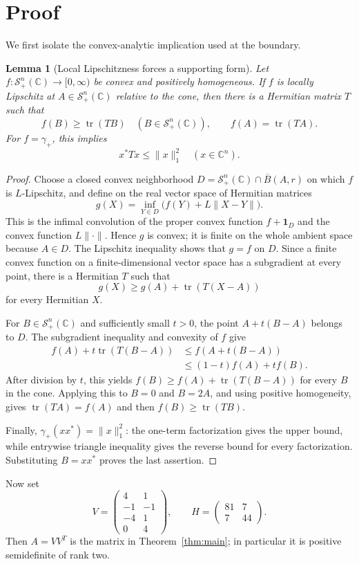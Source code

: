 \documentclass[11pt]{article}
\newtheorem{lemma}{Lemma}
\newcommand{\gp}{\gamma_+}
\newcommand{\psd}{\mathcal S_+}
\newcommand{\C}{\mathbb C}
\newcommand{\tr}{\operatorname{tr}}
\begin{document}
\section{Proof}

We first isolate the convex-analytic implication used at the boundary.

\begin{lemma}[Local Lipschitzness forces a supporting form]\label{lem:support}
Let $f:\psd^n(\C)\to[0,\infty)$ be convex and positively homogeneous. If
$f$ is locally Lipschitz at $A\in\psd^n(\C)$ relative to the cone, then there
is a Hermitian matrix $T$ such that
\[
 f(B)\geq \tr(TB)\quad(B\in\psd^n(\C)),
 \qquad f(A)=\tr(TA).
\]
For $f=\gp$, this implies
\[
 x^*Tx\leq\|x\|_1^2\quad(x\in\C^n).
\]
\end{lemma}

\begin{proof}
Choose a closed convex neighborhood
$D=\psd^n(\C)\cap\overline B(A,r)$ on which $f$ is $L$-Lipschitz, and define
on the real vector space of Hermitian matrices
\[
 g(X)=\inf_{Y\in D}\bigl(f(Y)+L\|X-Y\|\bigr).
\]
This is the infimal convolution of the proper convex function
$f+\mathbf 1_D$ and the convex function $L\|\cdot\|$. Hence $g$ is convex;
it is finite on the whole ambient space because $A\in D$. The Lipschitz
inequality shows that $g=f$ on $D$. Since a finite convex function on a
finite-dimensional vector space has a subgradient at every point, there is a
Hermitian $T$ such that
\[
 g(X)\geq g(A)+\tr(T(X-A))
\]
for every Hermitian $X$.

For $B\in\psd^n(\C)$ and sufficiently small $t>0$, the point
$A+t(B-A)$ belongs to $D$. The subgradient inequality and convexity of $f$
give
\begin{align*}
 f(A)+t\tr(T(B-A))
 &\leq f(A+t(B-A))\\
 &\leq (1-t)f(A)+tf(B).
\end{align*}
After division by $t$, this yields
$f(B)\geq f(A)+\tr(T(B-A))$ for every $B$ in the cone. Applying this to
$B=0$ and $B=2A$, and using positive homogeneity, gives
$\tr(TA)=f(A)$ and then $f(B)\geq\tr(TB)$.

Finally, $\gp(xx^*)=\|x\|_1^2$: the one-term factorization gives the upper
bound, while entrywise triangle inequality gives the reverse bound for every
factorization. Substituting $B=xx^*$ proves the last assertion.
\end{proof}

Now set
\[
 V=\begin{pmatrix}
 4&1\\-1&-1\\-4&1\\0&4
 \end{pmatrix},
 \qquad
 H=\begin{pmatrix}81&7\\7&44\end{pmatrix}.
\]
Then $A=VV^T$ is the matrix in Theorem~\ref{thm:main}; in particular it is
positive semidefinite of rank two.
\end{document}
